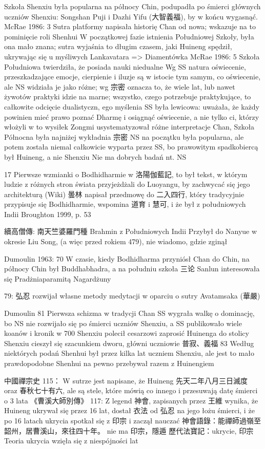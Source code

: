 Szkoła Shenxiu była popularna na północy Chin, podupadła po śmierci głównych uczniów Shenxiu: Songshan Puji i Dazhi Yifu (大智義福), by w końcu wygasnąć. %
McRae 1986: 3
Sutra platformy napisała historię Chan od nowa; wskazuje na to pominięcie roli Shenhui
W początkowej fazie istnienia Południowej Szkoły, była ona mało znana; sutra wyjaśnia to długim czasem, jaki Huineng spędził, ukrywając się u myśliwych
Lankavatara => Diamentówka
McRae 1986: 5
Szkoła Południowa twierdziła, że posiada nauki niedualne
Wg SS natura oświecenie, przeszkadzające emocje, cierpienie i iluzje są w istocie tym samym, co oświecenie, ale NS widziała je jako różne; wg 宗密 oznacza to, że wiele lat, lub nawet żywotów praktyki idzie na marne; wszystko, czego potrzebuje praktykujące, to całkowite odcięcie dualistyczn, ego myślenia
SS była lewicowa: uważała, że każdy powinien mieć prawo poznać Dharmę i osiągnąć oświecenie, a nie tylko ci, którzy włożyli w to wysiłek
Zongmi usystematyzował różne interpretacje Chan, Szkoła Północna była najniżej
wykładnia 宗密 NS na początku była popularna, ale potem została niemal całkowicie wyparta przez SS, bo prawowitym spadkobiercą był Huineng, a nie Shenxiu
Nie ma dobrych badań nt. NS

17 Pierwsze wzmianki o Bodhidharmie w 洛陽伽藍記, to był tekst, w którym ludzie z różnych stron świata przyjeżdżali do Luoyangu, by zachwycać się jego architekturą
(Wiki) 曇林 napisał przedmowę do 二入四行, który tradycyjnie przypisuje się Bodhidharmie, wspomina 道育 i 慧可, i że był z południowych Indii Broughton 1999, p. 53

續高僧傳:
南天竺婆羅門種 Brahmin z Południowych Indii
Przybył do Nanyue w okresie Liu Song, (a więc przed rokiem 479), nie wiadomo, gdzie zginął

Dumoulin 1963: 70
W czasie, kiedy Bodhidharma przyniósł Chan do Chin, na północy Chin był Buddhabhadra, a na południu szkoła 三论
Sanlun interesowała się Pradżniaparamitą Nagardżuny

79: 弘忍 rozwijał własne metody medytacji w oparciu o sutry Avatamsaka (華嚴)

Dumoulin 81
Pierwsza schizma w tradycji Chan
SS wygrała walkę o dominację, bo NS nie rozwijało się po śmierci uczniów Shenxiu, a SS publikowało wiele koanów i kronik
w 700 Shenxiu polecił cesarzowi zaprosić Huinenga do stolicy
Shenxiu cieszył się szacunkiem dworu, główni uczniowie 普寂、義福
83
Według niektórych podań Shenhui był przez kilka lat uczniem Shenxiu, ale jest to mało prawdopodobne
Shenhui na pewno przebywał razem z Huinengiem

中國禪宗史 115：
W sutrze jest napisane, że Huineng 先天二年八月三日滅度 oraz 春秋七十有六, ale są stele, które mówią co innego i przesuwają datę śmierci o 3 lata
《曹溪大師別傳》
117: Z legend 神會, zapisanych przez 王維 wynika, że Huineng ukrywał się przez 16 lat, dostał 衣法 od 弘忍 na jego łożu śmierci, i że po 16 latach ukrycia spotkał się z 印宗 i zaczął nauczać
神會語錄：能禪師過嶺至韶州，居曹溪山，來往四十年。 nie ma 印宗，隱遁
歷代法寶記：ukrycie, 印宗
Teoria ukrycia wzięła się z niespójności lat
\fi
